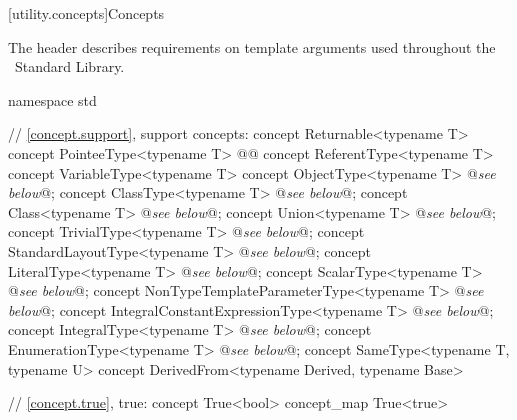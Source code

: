 \documentclass[american,twoside]{book}
\begin{document}
\noindent{}

\color{addclr}
[utility.concepts]{Concepts}

\pnum The  header describes requirements on template
arguments used throughout the \Cpp\ Standard Library.

\begin{codeblock}
namespace std {
  // \ref{concept.support}, support concepts:
  concept Returnable<typename T> { }
  concept PointeeType<typename T> { }
  @@
  concept ReferentType<typename T> { }
  concept VariableType<typename T> { }
  concept ObjectType<typename T> @\textit{see below}@;
  concept ClassType<typename T> @\textit{see below}@;
  concept Class<typename T> @\textit{see below}@;
  concept Union<typename T> @\textit{see below}@;
  concept TrivialType<typename T> @\textit{see below}@;
  concept StandardLayoutType<typename T> @\textit{see below}@;
  concept LiteralType<typename T> @\textit{see below}@;
  concept ScalarType<typename T> @\textit{see below}@;
  concept NonTypeTemplateParameterType<typename T> @\textit{see below}@;
  concept IntegralConstantExpressionType<typename T> @\textit{see below}@;
  concept IntegralType<typename T> @\textit{see below}@;
  concept EnumerationType<typename T> @\textit{see below}@;
  concept SameType<typename T, typename U> {  }
  concept DerivedFrom<typename Derived, typename Base> { }

  // \ref{concept.true}, true:
  concept True<bool> { }
  concept_map True<true> { }

}
\end{codeblock}
\end{document}
